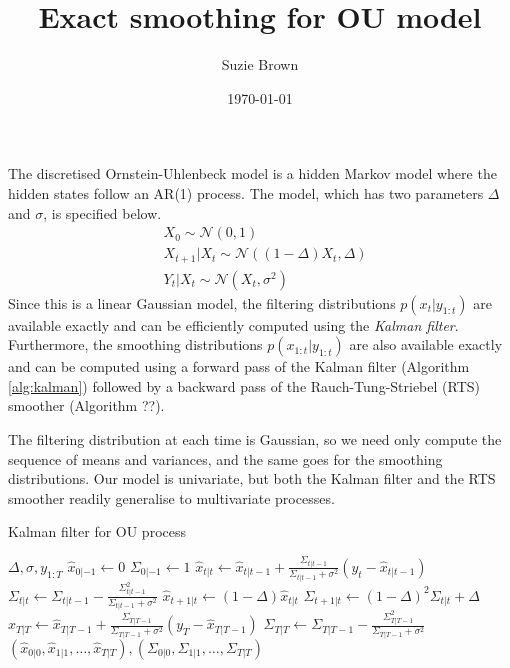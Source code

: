 \documentclass[fleqn]{article}
\title{Exact smoothing for OU model}
\author{Suzie Brown}
\date{\today}
\newcommand{\N}{\mathcal{N}}
\begin{document}
\maketitle
\thispagestyle{fancy}

The discretised Ornstein-Uhlenbeck model is a hidden Markov model where the hidden states follow an AR(1) process. The model, which has two parameters $\Delta$ and $\sigma$, is specified below.
\begin{align*}
& X_0 \sim \N(0,1) \\
& X_{t+1} | X_t \sim \N((1-\Delta)X_t, \Delta) \\
& Y_t | X_t \sim \N(X_t, \sigma^2)
\end{align*}
Since this is a linear Gaussian model, the filtering distributions $p(x_t | y_{1:t})$ are available exactly and can be efficiently computed using the \emph{Kalman filter}. Furthermore, the smoothing distributions $p(x_{1:t} | y_{1:t})$ are also available exactly and can be computed using a forward pass of the Kalman filter (Algorithm \ref{alg:kalman}) followed by a backward pass of the Rauch-Tung-Striebel (RTS) smoother (Algorithm ??).

The filtering distribution at each time is Gaussian, so we need only compute the sequence of means and variances, and the same goes for the smoothing distributions. Our model is univariate, but both the Kalman filter and the RTS smoother readily generalise to multivariate processes.

\begin{algorithm}
\caption{Kalman filter for OU process}
\label{alg:kalman}
\begin{algorithmic}[1]
\Require $\Delta, \sigma, y_{1:T}$
\State $\hat{x}_{0|-1} \gets 0$
\State $\Sigma_{0|-1} \gets 1$
	\State $\hat{x}_{t|t} \gets \hat{x}_{t|t-1} + \frac{\Sigma_{t|t-1}}{\Sigma_{t|t-1} + \sigma^2}(y_t - \hat{x}_{t|t-1})$
	\State $\Sigma_{t|t} \gets \Sigma_{t|t-1} - \frac{\Sigma_{t|t-1}^2}{\Sigma_{t|t-1} + \sigma^2}$
	\State $\hat{x}_{t+1|t} \gets (1-\Delta)\hat{x}_{t|t}$
	\State $\Sigma_{t+1|t} \gets (1-\Delta)^2 \Sigma_{t|t} + \Delta$
\EndFor
\State $\hat{x}_{T|T} \gets \hat{x}_{T|T-1} + \frac{\Sigma_{T|T-1}}{\Sigma_{T|T-1} + \sigma^2}(y_T - \hat{x}_{T|T-1})$
\State $\Sigma_{T|T} \gets \Sigma_{T|T-1} - \frac{\Sigma_{T|T-1}^2}{\Sigma_{T|T-1} + \sigma^2}$
\State\Return $(\hat{x}_{0|0}, \hat{x}_{1|1}, \dots, \hat{x}_{T|T}), (\Sigma_{0|0}, \Sigma_{1|1}, \dots, \Sigma_{T|T})$
\end{algorithmic}
\end{algorithm}


\end{document}
